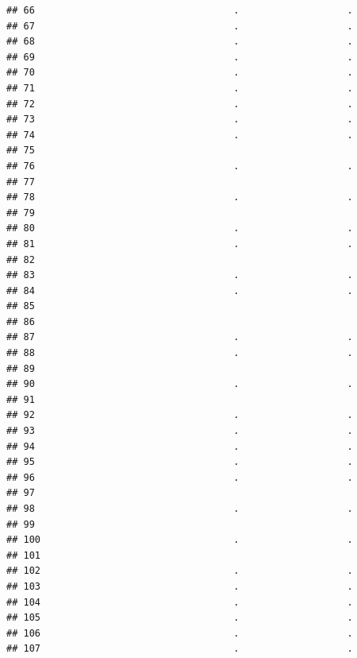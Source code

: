 \documentclass[
]{article}
\begin{document}
\begin{verbatim}
## 66                                   .                   .
## 67                                   .                   .
## 68                                   .                   .
## 69                                   .                   .
## 70                                   .                   .
## 71                                   .                   .
## 72                                   .                   .
## 73                                   .                   .
## 74                                   .                   .
## 75                                                        
## 76                                   .                   .
## 77                                                        
## 78                                   .                   .
## 79                                                        
## 80                                   .                   .
## 81                                   .                   .
## 82                                                        
## 83                                   .                   .
## 84                                   .                   .
## 85                                                        
## 86                                                        
## 87                                   .                   .
## 88                                   .                   .
## 89                                                        
## 90                                   .                   .
## 91                                                        
## 92                                   .                   .
## 93                                   .                   .
## 94                                   .                   .
## 95                                   .                   .
## 96                                   .                   .
## 97                                                        
## 98                                   .                   .
## 99                                                        
## 100                                  .                   .
## 101                                                       
## 102                                  .                   .
## 103                                  .                   .
## 104                                  .                   .
## 105                                  .                   .
## 106                                  .                   .
## 107                                  .                   .

\end{verbatim}
\end{document}
